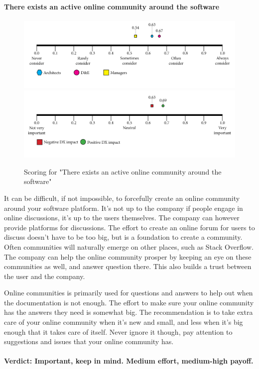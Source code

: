     \paragraph{There exists an active online community around the software}
    \begin{figure}[H]
        \centering
        \includegraphics[width=\linewidth]{scorelines/aspect16.png}
        \includegraphics[width=\linewidth]{dxscorelines/dxaspect16.png}
        \caption{Scoring for "There exists an active online community around the software"}
        \label{fig:aspect16}
    \end{figure}
    It can be difficult, if not impossible, to forcefully create an online community around your software platform. It's not up to the company if people engage in online discussions, it's up to the users themselves. The company can however provide platforms for discussions. The effort to create an online forum for users to discuss doesn't have to be too big, but is a foundation to create a community. Often communities will naturally emerge on other places, such as Stack Overflow. The company can help the online community prosper by keeping an eye on these communities as well, and answer question there. This also builds a trust between the user and the company. 
    
    Online communities is primarily used for questions and answers to help out when the documentation is not enough. The effort to make sure your online community has the answers they need is somewhat big. The recommendation is to take extra care of your online community when it's new and small, and less when it's big enough that it takes care of itself. Never ignore it though, pay attention to suggestions and issues that your online community has. \\ \\
    \textbf{Verdict: Important, keep in mind. Medium effort, medium-high payoff.}